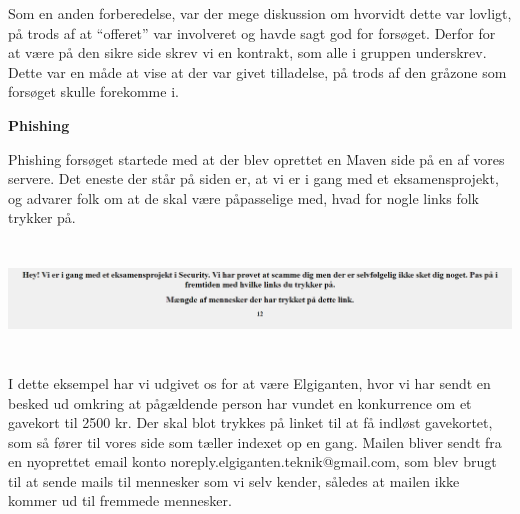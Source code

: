 \documentclass[11pt]{report}
\begin{document}
Som en anden forberedelse, var der mege diskussion om hvorvidt dette var lovligt, på trods af at “offeret” var involveret og havde sagt god for forsøget. Derfor for at være på den sikre side skrev vi en kontrakt, som alle i gruppen underskrev. Dette var en måde at vise at der var givet tilladelse, på trods af den gråzone som forsøget skulle forekomme i.

\noindent\textbf{Phishing}
\par Phishing forsøget startede med at der blev oprettet en Maven side på en af vores servere. Det eneste der står på siden er, at vi er i gang med et eksamensprojekt, og advarer folk om at de skal være påpasselige med, hvad for nogle links folk trykker på. 
\begin{center}
\includegraphics[height=3cm, width=17cm]{Capture}
\end{center}
I dette eksempel har vi udgivet os for at være Elgiganten, hvor vi har sendt en besked ud omkring at pågældende person har vundet en konkurrence om et gavekort til 2500 kr. Der skal blot trykkes på linket til at få indløst gavekortet, som så fører til vores side som tæller indexet op en gang. Mailen bliver sendt fra en nyoprettet email konto noreply.elgiganten.teknik@gmail.com, som blev brugt til at sende mails til mennesker som vi selv kender, således at mailen ikke kommer ud til fremmede mennesker. 
\end{document}
